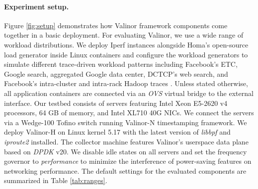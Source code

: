 

\paragraph{Experiment setup.}
Figure \ref{fig:setup} demonstrates how Valinor framework components come together in a basic deployment.
For evaluating Valinor, we use a wide range of workload distributions. We deploy Iperf instances alongside Homa's open-source load generator \cite{homa} inside Linux containers and configure the workload generators to simulate different trace-driven workload patterns including Facebook's ETC, Google search, aggregated Google data center, DCTCP's web search, and Facebook's intra-cluster and intra-rack Hadoop traces \cite{social,homa,fb-workload,dctcp}. Unless stated otherwise, all application containers are connected via an \textit{OVS} \cite{ovs} virtual bridge to the external interface.
Our testbed consists of servers featuring Intel Xeon  E5-2620 v4 processors, 64 GB of memory, and Intel XL710 40G NICs. We connect the servers via a Wedge-100 Tofino switch running Valinor-N timestamping framework. We deploy Valinor-H on Linux kernel 5.17 with the latest version of \textit{libbpf} and \textit{iproute2} installed. The collector machine features Valinor's userspace data plane based on \textit{DPDK} v20. We disable idle states on all servers and set the frequency governor to \textit{performance} to minimize the interference of power-saving features on networking performance.
The default settings for the evaluated components are summarized in Table \ref{tab:ranges}.

